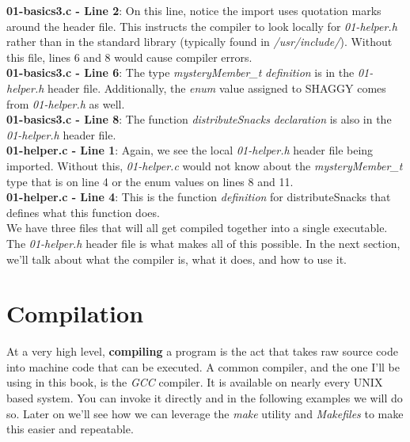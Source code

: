 \documentclass[../main.tex]{subfiles}
\begin{document}


\textbf{01-basics3.c - Line 2}: On this line, notice the import uses quotation marks around the header file.  This instructs the compiler to look locally for \textit{01-helper.h} rather than in the standard library (typically found in \textit{/usr/include/}).  Without this file, lines 6 and 8 would cause compiler errors.\\
\textbf{01-basics3.c - Line 6}: The type \textit{mysteryMember\_t} \textit{definition} is in the \textit{01-helper.h} header file.  Additionally, the \textit{enum} value assigned to SHAGGY comes from \textit{01-helper.h} as well.\\
\textbf{01-basics3.c - Line 8}: The function \textit{distributeSnacks} \textit{declaration} is also in the \textit{01-helper.h} header file.\\



\textbf{01-helper.c - Line 1}:  Again, we see the local \textit{01-helper.h} header file being imported.  Without this, \textit{01-helper.c} would not know about the \textit{mysteryMember\_t} type that is on line 4  or the enum values on lines 8 and 11.\\
\textbf{01-helper.c - Line 4}:  This is the function \textit{definition} for distributeSnacks that defines what this function does.\\

We have three files that will all get compiled together into a single executable.  The \textit{01-helper.h} header file is what makes all of this possible.  In the next section, we'll talk about what the compiler is, what it does, and how to use it.


\section{Compilation}

At a very high level, \textbf{compiling} a program is the act that takes raw source code into machine code that can be executed.  A common compiler, and the one I'll be using in this book, is the \textit{GCC} compiler.  It is available on nearly every UNIX based system.  You can invoke it directly and in the following examples we will do so.  Later on we'll see how we can leverage the \textit{make} utility and \textit{Makefiles} to make this easier and repeatable.
\end{document}
